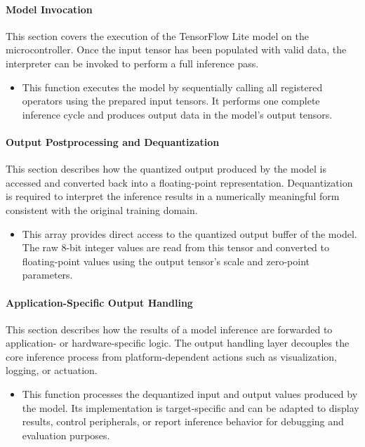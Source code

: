 \paragraph{Model Invocation}

This section covers the execution of the TensorFlow Lite model on the microcontroller. Once the input tensor has been populated with valid data, the interpreter can be invoked to perform a full inference pass.

\begin{itemize}
	\item {} 
	
	This function executes the model by sequentially calling all registered operators using the prepared input tensors. It performs one complete inference cycle and produces output data in the model’s output tensors.
\end{itemize}

\paragraph{Output Postprocessing and Dequantization}

This section describes how the quantized output produced by the model is accessed and converted back into a floating-point representation. Dequantization is required to interpret the inference results in a numerically meaningful form consistent with the original training domain.

\begin{itemize}
	\item {} 
	
	This array provides direct access to the quantized output buffer of the model. The raw 8-bit integer values are read from this tensor and converted to floating-point values using the output tensor’s scale and zero-point parameters.
\end{itemize}


\paragraph{Application-Specific Output Handling}

This section describes how the results of a model inference are forwarded to application- or hardware-specific logic. The output handling layer decouples the core inference process from platform-dependent actions such as visualization, logging, or actuation.

\begin{itemize}
	\item {} 
	
	This function processes the dequantized input and output values produced by the model. Its implementation is target-specific and can be adapted to display results, control peripherals, or report inference behavior for debugging and evaluation purposes.
\end{itemize}

